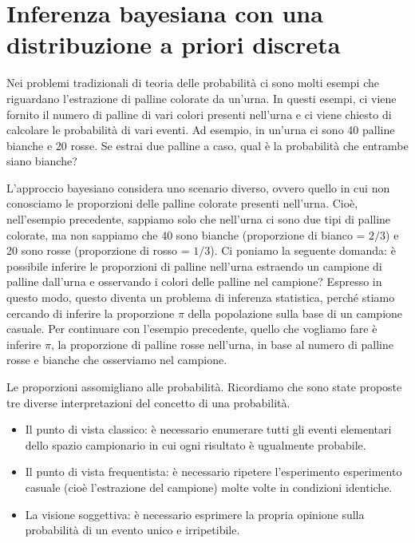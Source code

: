 \documentclass[
  11pt,
]{krantz}
\providecommand{\tightlist}{%
  \setlength{\itemsep}{0pt}\setlength{\parskip}{0pt}}
\theoremstyle{definition}
\theoremstyle{definition}
\theoremstyle{definition}
\theoremstyle{definition}
\theoremstyle{remark}
\begin{document}
\hypertarget{ch-prior-discr-binom}{%
\section{Inferenza bayesiana con una distribuzione a priori discreta}\label{ch-prior-discr-binom}}

Nei problemi tradizionali di teoria delle probabilità ci sono molti esempi che riguardano l'estrazione di palline colorate da un'urna. In questi esempi, ci viene fornito il numero di palline di vari colori presenti nell'urna e ci viene chiesto di calcolare le probabilità di vari eventi. Ad esempio, in un'urna ci sono 40 palline bianche e 20 rosse. Se estrai due palline a caso, qual è la probabilità che entrambe siano bianche?

L'approccio bayesiano considera uno scenario diverso, ovvero quello in cui non conosciamo le proporzioni delle palline colorate presenti nell'urna. Cioè, nell'esempio precedente, sappiamo solo che nell'urna ci sono due tipi di palline colorate, ma non sappiamo che 40 sono bianche (proporzione di bianco = \(2/3\)) e 20 sono rosse (proporzione di rosso = \(1/3\)). Ci poniamo la seguente domanda: è possibile inferire le proporzioni di palline nell'urna estraendo un campione di palline dall'urna e osservando i colori delle palline nel campione? Espresso in questo modo, questo diventa un problema di inferenza statistica, perché stiamo cercando di inferire la proporzione \(\pi\) della popolazione sulla base di un campione casuale. Per continuare con l'esempio precedente, quello che vogliamo fare è inferire \(\pi\), la proporzione di palline rosse nell'urna, in base al numero di palline rosse e bianche che osserviamo nel campione.

Le proporzioni assomigliano alle probabilità. Ricordiamo che sono state proposte tre diverse interpretazioni del concetto di una probabilità.

\begin{itemize}
\tightlist
\item
  Il punto di vista classico: è necessario enumerare tutti gli eventi elementari dello spazio campionario in cui ogni risultato è ugualmente probabile.
\item
  Il punto di vista frequentista: è necessario ripetere l'esperimento esperimento casuale (cioè l'estrazione del campione) molte volte in condizioni identiche.
\item
  La visione soggettiva: è necessario esprimere la propria opinione sulla probabilità di un evento unico e irripetibile.
\end{itemize}
\end{document}
